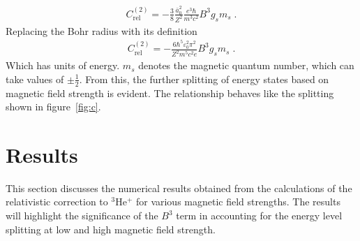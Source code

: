             \begin{align}
                C_{\text{rel}}^{(2)} = -\frac{3}{8} \frac{\bar{a}_0^2}{Z^2}\frac{ e^3 \hbar}{ m^3 c^2}B^3g_s m_s\;.
            \end{align}
            \noindent Replacing the Bohr radius with its definition
            \begin{align}
                C_{\text{rel}}^{(2)} = - \frac{6\hbar^5 \varepsilon_0^2 \pi^2}{Z^2 m^5 c^2 e} B^3 g_s m_s\;.
            \end{align}
            \noindent Which has units of energy. $m_s$ denotes the magnetic quantum number, which can take values of $\pm \frac{1}{2}$. From this, the further splitting of energy states based on magnetic field strength is evident. The relationship behaves like the splitting shown in figure~\ref{fig:c}.
    \section{Results}\label{sec:results}
        This section discusses the numerical results obtained from the calculations of the relativistic correction to $^3$He$^+$ for various magnetic field strengths. The results will highlight the significance of the $B^3$ term in accounting for the energy level splitting at low and high magnetic field strength.\\

